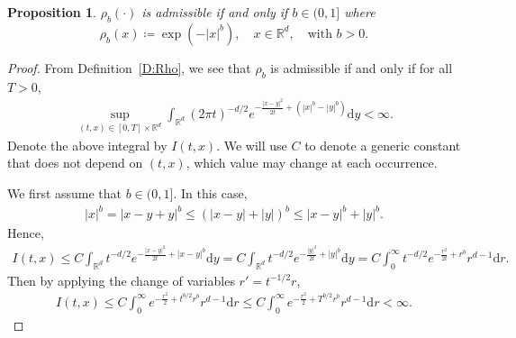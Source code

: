 \documentclass[a4paper,11pt]{article}%
\theoremstyle{plain}
\newtheorem{proposition}[theorem]{Proposition}
\theoremstyle{definition}
\numberwithin{equation}{section}
\newcommand{\R}{\mathbb{R}}
\newcommand{\ud}{\ensuremath{\mathrm{d}}}
\begin{document}
\begin{proposition}\label{P:adm}
	$\rho_b(\cdot)$ is admissible if and only if $b\in (0,1]$ where
	\begin{equation*}
	\rho_b(x) \coloneqq \exp\left(-|x|^b\right), \quad x\in\R^d,
	\quad \text{with $b>0$.}
	\end{equation*}
\end{proposition}
\begin{proof}
  From Definition~\eqref{D:Rho}, we see that $\rho_b$ is admissible if and only if for all $T>0$,
	\begin{align*}
	\sup_{(t,x)\in[0,T]\times\R^d} \int_{\R^d} \left(2\pi t\right)^{-d/2} e^{-\frac{|x-y|^2}{2t} + (|x|^b - |y|^b)} \ud y <\infty.
	\end{align*}
  Denote the above integral by $I(t,x)$. We will use $C$ to denote a generic constant that does not
  depend on $(t,x)$, which value may change at each occurrence.

	We first assume that $b\in (0,1]$. In this case,
	\begin{align*}
    | x | ^b
    = | x-y +y | ^b
    \le \left(|x-y| + |y|\right)^b
    \le |x-y|^b + |y|^b.
	\end{align*}
	Hence,
	\begin{align*}
    I(t,x) \le C \int_{\R^d} t^{-d/2} e^{-\frac{|x-y|^2}{2t} + |x-y|^b} \ud y
    = C \int_{\R^d} t^{-d/2} e^{-\frac{|y|^2}{2t} + |y|^b} \ud y
    = C \int_{0}^\infty t^{-d/2} e^{-\frac{r^2}{2t} + r^b} r^{d-1} \ud r.
	\end{align*}
	Then by applying the change of variables $r' = t^{-1/2}r$,
	\begin{align*}
    I(t,x) \le C \int_0^\infty e^{-\frac{r^2}{2} + t^{b/2} r^b} r^{d-1}\ud r
    \le C \int_0^\infty e^{-\frac{r^2}{2} + T^{b/2} r^b} r^{d-1}\ud r
    < \infty.
	\end{align*}


\end{proof}
\end{document}
